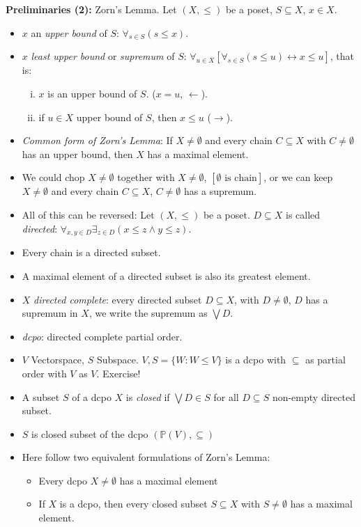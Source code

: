 \documentclass[headsepline=true,DIV=11]{scrartcl}
\theoremstyle{definition}
\begin{document}
{\bf Preliminaries (2):} Zorn's Lemma.
Let $(X,\le)$ be a poset, $S\subseteq X$, $x\in X$. 
\begin{itemize}
	\item $x$ an {\em upper bound} of $S$: $\forall_{s\in S}(s\le x)$.
	\item $x$ {\em least upper bound} or {\em supremum} of $S$: $\forall_{u\in X}[\forall_{s\in S}(s\le u) \leftrightarrow x\le u]$, that is:
	\begin{enumerate}[(i)]
		\item $x$ is an upper bound of $S$. ($x=u$, $\leftarrow$).
		\item if $u\in X$ upper bound of $S$, then $x\le u$ ($\rightarrow$).
	\end{enumerate}
	\item {\em Common form of Zorn's Lemma}: If $X\neq \emptyset$ and every chain $C\subseteq X$ with $C\neq \emptyset$ has an upper bound, then $X$ has a maximal element.
	\item We could chop $X\neq\emptyset$ together with $X\neq \emptyset$, $[\emptyset \text{ is chain}]$, or we can keep $X\neq \emptyset$ and every chain $C\subseteq X$, $C\neq\emptyset$ has a supremum.
	\item All of this can be reversed: 
		Let $(X,\le)$ be a poset.
		$D\subseteq X$ is called {\em directed}: $\forall_{x,y \in D} \exists_{z\in D}(x\le z \land y\le z)$.
	\item Every chain is a directed subset.
	\item A maximal element of a directed subset is also its greatest element.
	\item $X$ {\em directed complete}: every directed subset $D\subseteq X$, with $D\neq \emptyset$, $D$ has a supremum in $X$, we write the supremum as $\bigvee D$.
	\item {\em dcpo}: directed complete partial order.
	\item $V$ Vectorspace, $S$ Subspace. $V, S =\{ W\colon W\le V\}$ is a dcpo with $\subseteq$ as partial order with $V$ as $V$. Exercise!
	
	\item A subset $S$ of a dcpo $X$ is {\em closed} if $\bigvee D\in S$ for all $D\subseteq S$ non-empty directed subset.
	\item $S$ is closed subset of the dcpo $(\mathbb P(V), \subseteq)$
	\item Here follow two equivalent formulations of Zorn's Lemma:
	\begin{itemize}
		\item Every dcpo $X\neq \emptyset$ has a maximal element
		\item If $X$ is a dcpo, then every closed subset $S\subseteq X$ with $S\neq \emptyset$ has a maximal element.
	\end{itemize}
\end{itemize}
\end{document}
